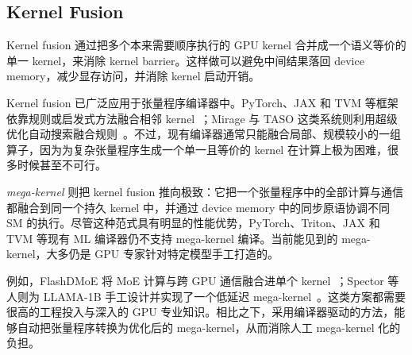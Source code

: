 \subsection{Kernel Fusion}
\label{subsec:kernel_fusion}
Kernel fusion 通过把多个本来需要顺序执行的 GPU kernel 合并成一个语义等价的单一 kernel，来消除 kernel barrier。这样做可以避免中间结果落回 device memory，减少显存访问，并消除 kernel 启动开销。

Kernel fusion 已广泛应用于张量程序编译器中。PyTorch、JAX 和 TVM 等框架依靠规则或启发式方法融合相邻 kernel~\cite{pytorch, jax2018github, tvm}；Mirage 与 TASO 这类系统则利用超级优化自动搜索融合规则~\cite{TASO, wu2025mirage}。不过，现有编译器通常只能融合局部、规模较小的一组算子，因为为复杂张量程序生成一个单一且等价的 kernel 在计算上极为困难，很多时候甚至不可行。

{\em mega-kernel} 则把 kernel fusion 推向极致：它把一个张量程序中的全部计算与通信都融合到同一个持久 kernel 中，并通过 device memory 中的同步原语协调不同 SM 的执行。尽管这种范式具有明显的性能优势，PyTorch、Triton、JAX 和 TVM 等现有 ML 编译器仍不支持 mega-kernel 编译。当前能见到的 mega-kernel，大多仍是 GPU 专家针对特定模型手工打造的。

例如，FlashDMoE 将 MoE 计算与跨 GPU 通信融合进单个 kernel~\cite{aimuyo2025flashdmoe}；Spector 等人则为 LLAMA-1B 手工设计并实现了一个低延迟 mega-kernel~\cite{touvron2023llama,megakernel}。这类方案都需要很高的工程投入与深入的 GPU 专业知识。相比之下，\sys 采用编译器驱动的方法，能够自动把张量程序转换为优化后的 mega-kernel，从而消除人工 mega-kernel 化的负担。
